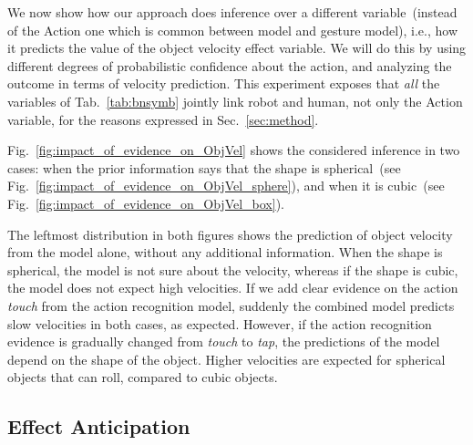 We now show how our approach does inference over a different variable~(instead of the Action one which is common between \AffWords{} model and gesture model), i.e., how it predicts the value of the object velocity effect variable.
We will do this by using different degrees of probabilistic confidence about the action, and analyzing the outcome in terms of velocity prediction.
This experiment exposes that \emph{all} the variables of Tab.~\ref{tab:bnsymb} jointly link robot and human, not only the Action variable, for the reasons expressed in Sec.~\ref{sec:method}.

Fig.~\ref{fig:impact_of_evidence_on_ObjVel} shows the considered inference in two cases: when the prior information says that the shape is spherical~(see Fig.~\ref{fig:impact_of_evidence_on_ObjVel_sphere}), and when it is cubic~(see Fig.~\ref{fig:impact_of_evidence_on_ObjVel_box}).

The leftmost distribution in both figures shows the prediction of object velocity from the \AffWords{} model alone, without any additional information.
When the shape is spherical, the model is not sure about the velocity, whereas if the shape is cubic, the model does not expect high velocities.
If we add clear evidence on the action \emph{touch} from the action recognition model, suddenly the combined model predicts slow velocities in both cases, as expected.
However, if the action recognition evidence is gradually changed from \emph{touch} to \emph{tap}, the predictions of the model depend on the shape of the object.
Higher velocities are expected for spherical objects that can roll, compared to cubic objects.

\subsection{Effect Anticipation}
\label{sec:results:anticipation_effects}

